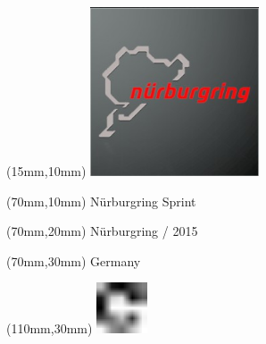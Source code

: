 \null\newpage
\begin{textblock*}{50mm}(15mm,10mm)%
\includegraphics[width=50mm]{LG/2015-05-20_00089.png}
\end{textblock*}
\begin{textblock*}{130mm}(70mm,10mm)%
{\fontsize{20}{20}\selectfont Nürburgring Sprint}\\
\end{textblock*}
\begin{textblock*}{120mm}(70mm,20mm)%
{\fontsize{16}{16}\selectfont Nürburgring / 2015}\\
\end{textblock*}
\begin{textblock*}{120mm}(70mm,30mm)%
{\fontsize{12}{12}\selectfont Germany}
\end{textblock*}
\begin{textblock*}{30mm}(110mm,30mm)%
\centering
\includegraphics[height=15mm]{icons/fa-rotate-right.pdf}
\end{textblock*}
